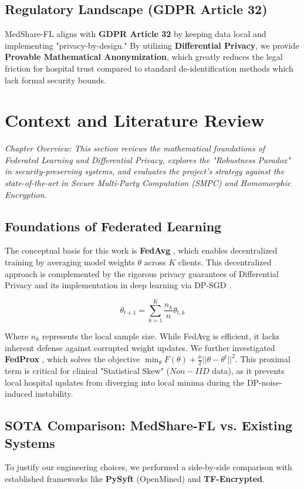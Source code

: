 \documentclass[10pt, a4paper, twocolumn]{article}
\begin{document}
\subsection{Regulatory Landscape (GDPR Article 32)}
MedShare-FL aligns with \textbf{GDPR Article 32} by keeping data local and implementing "privacy-by-design." By utilizing \textbf{Differential Privacy}, we provide \textbf{Provable Mathematical Anonymization}, which greatly reduces the legal friction for hospital trust compared to standard de-identification methods which lack formal security bounds.

\section{Context and Literature Review}
\label{sec:litreview}

\textit{Chapter Overview: This section reviews the mathematical foundations of Federated Learning and Differential Privacy, explores the "Robustness Paradox" in security-preserving systems, and evaluates the project's strategy against the state-of-the-art in Secure Multi-Party Computation (SMPC) and Homomorphic Encryption.}

\subsection{Foundations of Federated Learning}
The conceptual basis for this work is \textbf{FedAvg} \cite{mcmahan2017}, which enables decentralized training by averaging model weights $\theta$ across $K$ clients. This decentralized approach is complemented by the rigorous privacy guarantees of Differential Privacy \cite{dwork2006} and its implementation in deep learning via DP-SGD \cite{abadi2016}.

\begin{equation}
    \theta_{t+1} = \sum_{k=1}^K \frac{n_k}{n} \theta_{t,k}
\end{equation}

Where $n_k$ represents the local sample size. While FedAvg is efficient, it lacks inherent defense against corrupted weight updates. We further investigated \textbf{FedProx} \cite{li2020}, which solves the objective $\min_{\theta} F(\theta) + \frac{\mu}{2} ||\theta - \theta^t||^2$. This proximal term is critical for clinical "Statistical Skew" ($Non-IID$ data), as it prevents local hospital updates from diverging into local minima during the DP-noise-induced instability.

\subsection{SOTA Comparison: MedShare-FL vs. Existing Systems}
To justify our engineering choices, we performed a side-by-side comparison with established frameworks like \textbf{PySyft} (OpenMined) and \textbf{TF-Encrypted}.
\end{document}
